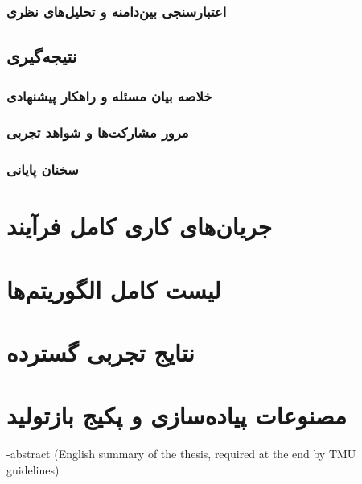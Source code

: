 \documentclass[oneside,openany,phd]{TMU-Thesis}
\begin{document}
\subsection{اعتبارسنجی بین‌دامنه و تحلیل‌های نظری}

\section{نتیجه‌گیری}
\subsection{خلاصه بیان مسئله و راهکار پیشنهادی}
\subsection{مرور مشارکت‌ها و شواهد تجربی}
\subsection{سخنان پایانی}

\newpage

\pagestyle{empty}
{
\onehalfspacing

\nocite{*}

}

\pagestyle{fancy}
\appendix
\chapter{جریان‌های کاری کامل فرآیند}
\newpage
\chapter{لیست کامل الگوریتم‌ها}
\newpage
\chapter{نتایج تجربی گسترده}
\newpage
\chapter{مصنوعات پیاده‌سازی و پکیج بازتولید}

\newpage

\en-abstract{
(English summary of the thesis, required at the end by TMU guidelines)
}
\latinfirstPage
\end{document}
